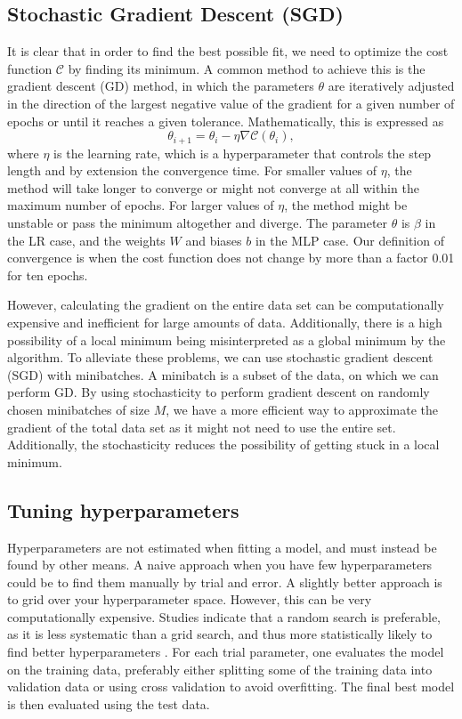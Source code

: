 \documentclass[a4paper, 11pt, twocolumn]{article}
\begin{document}
\subsection{Stochastic Gradient Descent (SGD)}
\label{SGD}
It is clear that in order to find the best possible fit, we need to optimize the
cost function $\mathcal{C}$ by finding its minimum. A common method to achieve
this is the gradient descent (GD) method, in which the parameters $\theta$ are
iteratively adjusted in the direction of the largest negative value of the
gradient for a given number of epochs or until it reaches a given tolerance.
Mathematically, this is expressed as
\begin{equation}
\theta_{i+1} = \theta_i -\eta \nabla \mathcal{C}(\theta_i),
\end{equation}
where $\eta$ is the learning rate, which is a hyperparameter that controls the
step length and by extension the convergence time. For smaller values of $\eta$,
the method will take longer to converge or might not converge at all within the
maximum number of epochs. For larger values of $\eta$, the method might be unstable or
pass the minimum altogether and diverge. The parameter $\theta$ is $\beta$ in
the LR case, and the weights $W$ and biases $b$ in the MLP case.
Our definition of convergence is when the cost function does not change by more
than a factor 0.01 for ten epochs.

However, calculating the gradient on the entire data set can be computationally
expensive and inefficient for large amounts of data. Additionally, there is a high
possibility of a local minimum being misinterpreted as a global minimum by the
algorithm. To alleviate these problems, we can use stochastic gradient descent
(SGD) with minibatches.  A minibatch is a subset of the data, on which we can
perform GD. By using stochasticity to perform gradient descent on randomly chosen
minibatches of size $M$, we have a more efficient way to approximate the gradient
of the total data set as it might not need to use the entire set. Additionally,
the stochasticity reduces the possibility of getting stuck in a local minimum.

\subsection{Tuning hyperparameters}
\label{subsec:tuning_hyperparameters}
Hyperparameters are not estimated when fitting a model, and must instead be
found by other means. A naive approach when you have few hyperparameters could
be to find them manually by trial and error. A slightly better approach is to
grid over your hyperparameter space. However, this can be very computationally
expensive. Studies indicate that a random search is preferable, as it is less
systematic than a grid search, and thus more statistically likely to find better
hyperparameters  \cite{bergstra2012random}. For each trial parameter, one evaluates
the model on the training data, preferably either splitting some of
the training data into validation data or using cross validation to avoid overfitting.
The final best model is then evaluated using the test data.
\end{document}
